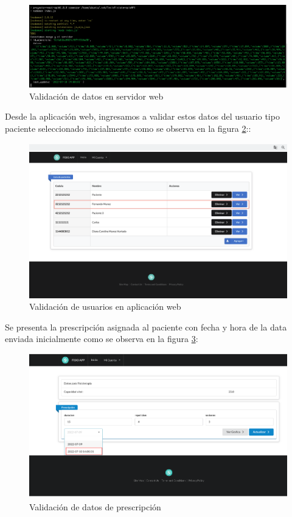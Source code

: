 \documentclass[12pt]{article}
\begin{document}
\begin{figure}[ht]
\centering
\includegraphics[scale=0.3]{imag/TEST5Console.png}
\caption{Validación de datos en servidor web}
\label{44}
\end{figure}
\FloatBarrier

Desde la aplicación web, ingresamos a validar estos datos del usuario tipo paciente seleccionado inicialmente como se observa en la figura \ref{45}::

\begin{figure}[ht]
\centering
\includegraphics[scale=0.3]{imag/TEST6UserF.png}
\caption{Validación de usuarios en aplicación web }
\label{45}
\end{figure}
\FloatBarrier

Se presenta la prescripción asignada al paciente con fecha y hora de la data enviada inicialmente como se observa en la figura \ref{46}:

\begin{figure}[ht]
\centering
\includegraphics[scale=0.3]{imag/TEST7Preescrip.png}
\caption{Validación de datos de prescripción }
\label{46}
\end{figure}
\FloatBarrier
\end{document}
